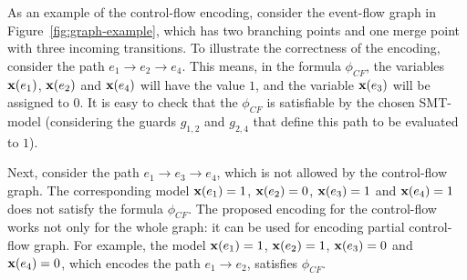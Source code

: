 As an example of the control-flow encoding, consider the event-flow graph in Figure~\ref{fig:graph-example}, which has two branching points and one merge point with three incoming transitions.
To illustrate the correctness of the encoding, consider the path $e_1 \rightarrow e_2 \rightarrow e_4$.
This means, in the formula $\phi_{CF}$, the variables $\mathbf{x}(e_1)$, $\mathbf{x}(e_2)$ and $\mathbf{x}(e_4)$ will have the value $1$, and the variable $\mathbf{x}(e_3)$ will be assigned to $0$.
It is easy to check that the $\phi_{CF}$ is satisfiable by the chosen SMT-model (considering the guards $g_{1,2}$ and $g_{2,4}$ that define this path to be evaluated to $1$).

Next, consider the path $e_1 \rightarrow e_3 \rightarrow e_4$, which is not allowed by the control-flow graph.
The corresponding model $\mathbf{x}(e_1)=1$, $\mathbf{x}(e_2)=0$, $\mathbf{x}(e_3)=1$ and $\mathbf{x}(e_4)=1$ does not satisfy the formula $\phi_{CF}$.
The proposed encoding for the control-flow works not only for the whole graph: it can be used for encoding partial control-flow graph.
For example, the model $\mathbf{x}(e_1)=1$, $\mathbf{x}(e_2)=1$, $\mathbf{x}(e_3)=0$ and $\mathbf{x}(e_4)=0$, which encodes the path $e_1 \rightarrow e_2$, satisfies $\phi_{CF}$.

